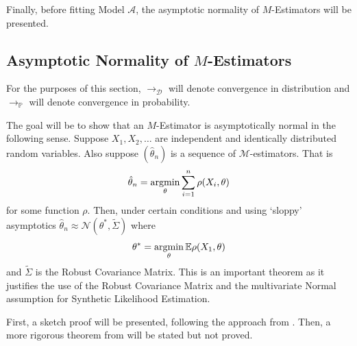 Finally, before fitting Model $\mathcal{A}$, the asymptotic normality of $M$-Estimators will be presented.

\subsection{Asymptotic Normality of \texorpdfstring{$M$}{M}-Estimators}
\label{subsec:theoretical-properties}

For the purposes of this section, $\to_{\mathcal{D}}$ will denote convergence in distribution and $\to_{\mathbb{P}}$ will denote convergence in probability.

The goal will be to show that an $M$-Estimator is asymptotically normal in the following sense. Suppose $X_1, X_2, \dots$ are independent and identically distributed random variables. Also suppose $(\hat{\theta}_n)$ is a sequence of $\mathcal{M}$-estimators. That is
\begin{equation}
    \label{eqn:estimators}
    \hat{\theta}_n = \argmin_{\theta} \sum_{i=1}^n \rho(X_i, \theta)
\end{equation}
for some function $\rho$. Then, under certain conditions and using `sloppy' asymptotics $\hat{\theta}_n \approx \mathcal{N}(\theta^*, \tilde{\Sigma})$ where
\begin{equation}
    \theta^* = \argmin_{\theta} \mathbb{E} \rho(X_1, \theta)
\end{equation}
and $\tilde{\Sigma}$ is the Robust Covariance Matrix. This is an important theorem as it justifies the use of the Robust Covariance Matrix and the multivariate Normal assumption for Synthetic Likelihood Estimation.

First, a sketch proof will be presented, following the approach from \cite{geyer_2013}. Then, a more rigorous theorem from \cite{pollard_1985} will be stated but not proved.


